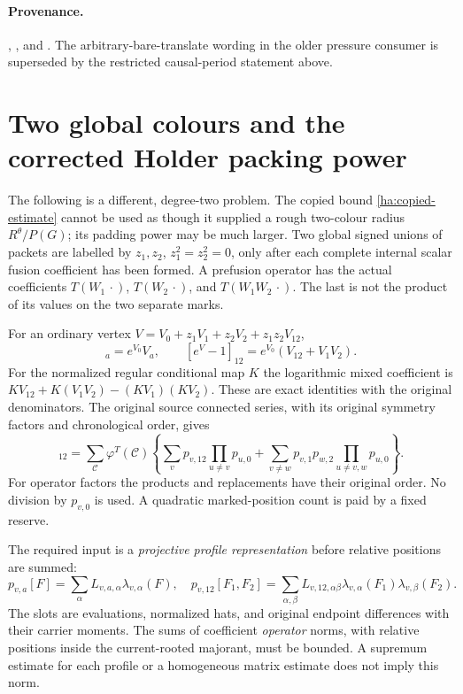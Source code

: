 \paragraph{Provenance.}
,
,
and .
The arbitrary-bare-translate wording in the older pressure consumer is
superseded by the restricted causal-period statement above.

\section{Two global colours and the corrected Holder packing power}
\label{ha:two-colour}

The following is a different, degree-two problem.  The copied bound
\eqref{ha:copied-estimate} cannot be used as though it supplied a rough
two-colour radius $R^\theta/P(G)$; its padding power may be much larger.
Two global signed unions of packets are labelled by
$z_1,z_2$, $z_1^2=z_2^2=0$, only after each complete internal scalar
fusion coefficient has been formed.  A prefusion operator has the actual
coefficients
$T(W_1\,\cdot)$, $T(W_2\,\cdot)$, and $T(W_1W_2\,\cdot)$.
The last is not the product of its values on the two separate marks.

For an ordinary vertex $V=V_0+z_1V_1+z_2V_2+z_1z_2V_{12}$,
\begin{equation}
 [e^V-1]_a=e^{V_0}V_a,\qquad
 [e^V-1]_{12}=e^{V_0}(V_{12}+V_1V_2).
 \label{ha:vertex-two}
\end{equation}
For the normalized regular conditional map $K$ the logarithmic mixed
coefficient is
$KV_{12}+K(V_1V_2)-(KV_1)(KV_2)$.  These are exact identities with
the original denominators.  The original source connected series, with
its original symmetry factors and chronological order, gives
\begin{equation}
 [R'_j(X)]_{12}=\sum_{\mathcal C}\varphi^T(\mathcal C)
 \left\{\sum_vp_{v,12}\prod_{u\ne v}p_{u,0}
  +\sum_{v\ne w}p_{v,1}p_{w,2}\prod_{u\ne v,w}p_{u,0}\right\}.
 \label{ha:two-cluster}
\end{equation}
For operator factors the products and replacements have their original
order.  No division by $p_{v,0}$ is used.  A quadratic marked-position
count is paid by a fixed reserve.

The required input is a \emph{projective profile representation} before
relative positions are summed:
\begin{equation}
 p_{v,a}[F]=\sum_\alpha L_{v,a,\alpha}\lambda_{v,\alpha}(F),
 \quad
 p_{v,12}[F_1,F_2]=\sum_{\alpha,\beta}
  L_{v,12,\alpha\beta}\lambda_{v,\alpha}(F_1)
                           \lambda_{v,\beta}(F_2).
 \label{ha:slots}
\end{equation}
The slots are evaluations, normalized hats, and original endpoint
differences with their carrier moments.  The sums of coefficient
\emph{operator} norms, with relative positions inside the current-rooted
majorant, must be bounded.  A supremum estimate for each profile or a
homogeneous matrix estimate does not imply this norm.

